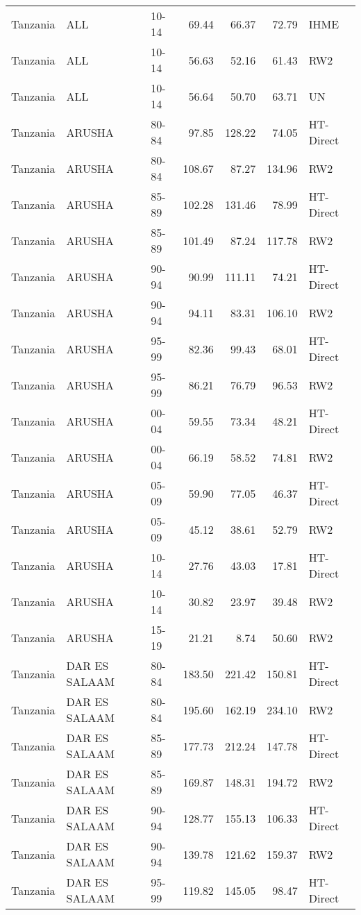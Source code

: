 \begin{longtable}{lllrrrl}
  Tanzania & ALL & 10-14 & 69.44 & 66.37 & 72.79 & IHME \\ 
  Tanzania & ALL & 10-14 & 56.63 & 52.16 & 61.43 & RW2 \\ 
  Tanzania & ALL & 10-14 & 56.64 & 50.70 & 63.71 & UN \\ 
  Tanzania & ARUSHA & 80-84 & 97.85 & 128.22 & 74.05 & HT-Direct \\ 
  Tanzania & ARUSHA & 80-84 & 108.67 & 87.27 & 134.96 & RW2 \\ 
  Tanzania & ARUSHA & 85-89 & 102.28 & 131.46 & 78.99 & HT-Direct \\ 
  Tanzania & ARUSHA & 85-89 & 101.49 & 87.24 & 117.78 & RW2 \\ 
  Tanzania & ARUSHA & 90-94 & 90.99 & 111.11 & 74.21 & HT-Direct \\ 
  Tanzania & ARUSHA & 90-94 & 94.11 & 83.31 & 106.10 & RW2 \\ 
  Tanzania & ARUSHA & 95-99 & 82.36 & 99.43 & 68.01 & HT-Direct \\ 
  Tanzania & ARUSHA & 95-99 & 86.21 & 76.79 & 96.53 & RW2 \\ 
  Tanzania & ARUSHA & 00-04 & 59.55 & 73.34 & 48.21 & HT-Direct \\ 
  Tanzania & ARUSHA & 00-04 & 66.19 & 58.52 & 74.81 & RW2 \\ 
  Tanzania & ARUSHA & 05-09 & 59.90 & 77.05 & 46.37 & HT-Direct \\ 
  Tanzania & ARUSHA & 05-09 & 45.12 & 38.61 & 52.79 & RW2 \\ 
  Tanzania & ARUSHA & 10-14 & 27.76 & 43.03 & 17.81 & HT-Direct \\ 
  Tanzania & ARUSHA & 10-14 & 30.82 & 23.97 & 39.48 & RW2 \\ 
  Tanzania & ARUSHA & 15-19 & 21.21 & 8.74 & 50.60 & RW2 \\ 
  Tanzania & DAR ES SALAAM & 80-84 & 183.50 & 221.42 & 150.81 & HT-Direct \\ 
  Tanzania & DAR ES SALAAM & 80-84 & 195.60 & 162.19 & 234.10 & RW2 \\ 
  Tanzania & DAR ES SALAAM & 85-89 & 177.73 & 212.24 & 147.78 & HT-Direct \\ 
  Tanzania & DAR ES SALAAM & 85-89 & 169.87 & 148.31 & 194.72 & RW2 \\ 
  Tanzania & DAR ES SALAAM & 90-94 & 128.77 & 155.13 & 106.33 & HT-Direct \\ 
  Tanzania & DAR ES SALAAM & 90-94 & 139.78 & 121.62 & 159.37 & RW2 \\ 
  Tanzania & DAR ES SALAAM & 95-99 & 119.82 & 145.05 & 98.47 & HT-Direct \\ 

\end{longtable}
